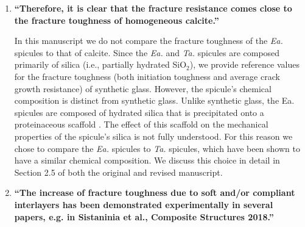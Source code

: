 \documentclass[11pt,letterpaper]{report}
\makeatletter
\newcommand{\TA}{\textit{Ta.\@}\xspace}
\newcommand{\EA}{\textit{Ea.\@}\xspace}
\makeatother
\begin{document}
\begin{enumerate}[label=\textit{1.\arabic*},wide, labelwidth=!, labelindent=0pt]
In response to this feedback, we have incorporated the additional data into the revised version of the manuscript and have made four major changes, enumerated as \ref{Mc01}--\ref{Mc04} in the \textit{LoC}, and 11 minor changes, enumerated as \ref{mc01}--\ref{mc011} in the \textit{Loc}. Through these changes we describe the observed increase in fracture initiation toughness for small $\alpha$ and its potential causes. While this new finding contrasts with the data presented in the original version it does not invalidate our original assertion that the \EA spicule's architecture does not provide the same magnitude of enhancements observed in many other biological materials. For example, while the \EA spicule's architecture can provide a ten fold enhancement to fracture initiation toughness, this still pales in comparison to the 250 fold enhancement observed in nacre \cite{jackson1988mechanical}. Through these changes we also reaffirm this assertion in light of these new observations.

\item \label{r1c5} {\bf ``Therefore, it is clear that the fracture resistance comes close to the fracture toughness of homogeneous calcite.''}

In this manuscript we do not compare the fracture toughness of the \EA spicules to that of calcite. Since the \EA and \TA spicules are composed primarily of silica (i.e., partially hydrated SiO$_2$), we provide reference values for the fracture toughness (both initiation toughness and average crack growth resistance) of synthetic glass. However, the spicule's chemical composition is distinct from synthetic glass. Unlike synthetic glass, the Ea. spicules are composed of hydrated silica that is precipitated onto a proteinaceous scaffold \cite{ehrlich2010chitin}. The effect of this scaffold on the mechanical properties of the spicule's silica is not fully understood. For this reason we chose to compare the \EA spicules to \TA spicules, which have been shown to have a similar chemical composition. We discuss this choice in detail in Section 2.5 of both the original and revised manuscript.

\item \label{r1c6} {\bf ``The increase of fracture toughness due to soft and/or compliant interlayers has been demonstrated experimentally in several papers, e.g. in Sistaninia et al., Composite Structures 2018.''}


\end{enumerate}
\end{document}
